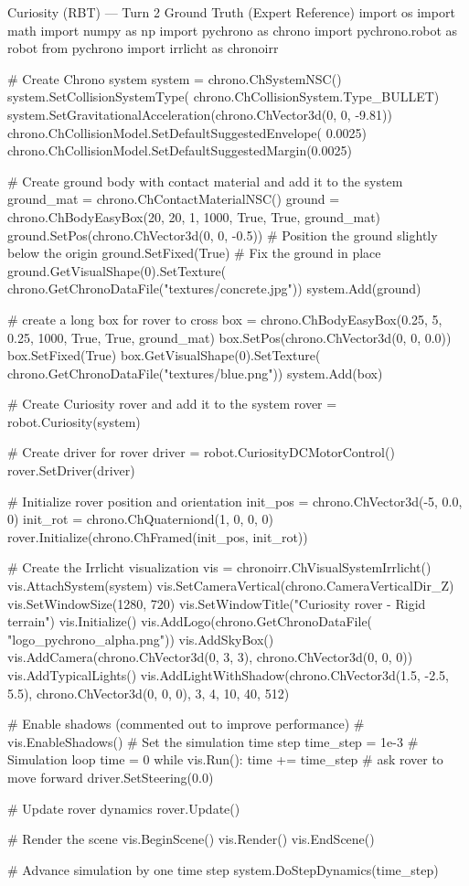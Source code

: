 \begin{CodeBlock}{Curiosity (RBT) --- Turn 2 Ground Truth (Expert Reference)}
import os
import math
import numpy as np
import pychrono as chrono
import pychrono.robot as robot
from pychrono import irrlicht as chronoirr

# Create Chrono system
system = chrono.ChSystemNSC()
system.SetCollisionSystemType(
    chrono.ChCollisionSystem.Type_BULLET)
system.SetGravitationalAcceleration(chrono.ChVector3d(0, 0, -9.81))
chrono.ChCollisionModel.SetDefaultSuggestedEnvelope(
    0.0025)
chrono.ChCollisionModel.SetDefaultSuggestedMargin(0.0025)

# Create ground body with contact material and add it to the system
ground_mat = chrono.ChContactMaterialNSC()
ground = chrono.ChBodyEasyBox(20, 20, 1, 1000, True, True, ground_mat)
ground.SetPos(chrono.ChVector3d(0, 0, -0.5))  # Position the ground slightly below the origin
ground.SetFixed(True)  # Fix the ground in place
ground.GetVisualShape(0).SetTexture(
    chrono.GetChronoDataFile("textures/concrete.jpg"))
system.Add(ground)

# create a long box for rover to cross
box = chrono.ChBodyEasyBox(0.25, 5, 0.25, 1000, True, True, ground_mat)
box.SetPos(chrono.ChVector3d(0, 0, 0.0))
box.SetFixed(True)
box.GetVisualShape(0).SetTexture(
    chrono.GetChronoDataFile("textures/blue.png"))
system.Add(box)

# Create Curiosity rover and add it to the system
rover = robot.Curiosity(system)

# Create driver for rover
driver = robot.CuriosityDCMotorControl()
rover.SetDriver(driver)

# Initialize rover position and orientation
init_pos = chrono.ChVector3d(-5, 0.0, 0)
init_rot = chrono.ChQuaterniond(1, 0, 0, 0)
rover.Initialize(chrono.ChFramed(init_pos, init_rot))

# Create the Irrlicht visualization
vis = chronoirr.ChVisualSystemIrrlicht()
vis.AttachSystem(system)
vis.SetCameraVertical(chrono.CameraVerticalDir_Z)
vis.SetWindowSize(1280, 720)
vis.SetWindowTitle("Curiosity rover - Rigid terrain")
vis.Initialize()
vis.AddLogo(chrono.GetChronoDataFile(
    "logo_pychrono_alpha.png"))
vis.AddSkyBox()
vis.AddCamera(chrono.ChVector3d(0, 3, 3), chrono.ChVector3d(0, 0, 0))
vis.AddTypicalLights()
vis.AddLightWithShadow(chrono.ChVector3d(1.5, -2.5, 5.5), chrono.ChVector3d(0, 0, 0), 3, 4, 10, 40, 512)

# Enable shadows (commented out to improve performance)
# vis.EnableShadows()
# Set the simulation time step
time_step = 1e-3
# Simulation loop
time = 0
while vis.Run():
    time += time_step
    # ask rover to move forward
    driver.SetSteering(0.0)

    # Update rover dynamics
    rover.Update()

    # Render the scene
    vis.BeginScene()
    vis.Render()
    vis.EndScene()

    # Advance simulation by one time step
    system.DoStepDynamics(time_step)
\end{CodeBlock}

